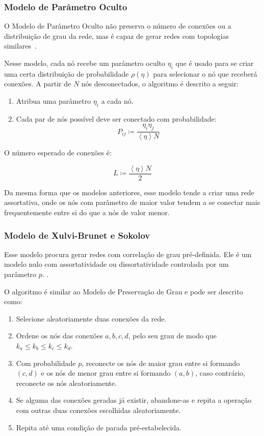 \documentclass[12pt,a4paper]{article}
\theoremstyle{hypo}
\newcommand{\avg}[1]{\left\langle #1 \right\rangle} %
\newcommand{\defn}{\coloneqq} %
\begin{document}
\subsubsection{Modelo de Parâmetro Oculto}

O Modelo de Parâmetro Oculto não preserva o número de conexões ou a distribuição de grau da rede, mas é capaz de gerar redes com topologias similares~\cite{Barabasi2016-rn}.

Nesse modelo, cada nó recebe um parâmetro oculto $\eta_i$ que é usado para se criar uma certa distribuição de probabilidade $\rho(\eta)$ para selecionar o nó que receberá conexões. A partir de $N$ nós desconectados, o algoritmo é descrito a seguir:

\begin{enumerate}
\item Atribua uma parâmetro $\eta_i$ a cada nó.
\item Cada par de nós possível deve ser conectado com probabilidade:
\begin{equation}
P_{ij} \defn \frac{\eta_i \eta_j}{\avg{\eta}N}
\end{equation}
\end{enumerate}

O número esperado de conexões é:

\begin{equation}
L \defn \frac{\avg{\eta}N}{2} 
\end{equation}

Da mesma forma que os modelos anteriores, esse modelo tende a criar uma rede assortativa, onde os nós com parâmetro de maior valor tendem a se conectar mais frequentemente entre si do que a nós de valor menor.

\subsubsection{Modelo de Xulvi-Brunet e Sokolov}

Esse modelo procura gerar redes com correlação de grau pré-definida. Ele é um modelo nulo com assortatividade ou dissortatividade controlada por um parâmetro $p$. \cite{Xulvi-Brunet2004-qg}.

O algoritmo é similar ao Modelo de Preservação de Grau e pode ser descrito como:

\begin{enumerate}
\item Selecione aleatoriamente duas conexões da rede.
\item Ordene os nós das conexões $a, b, c, d$, pelo seu grau de modo que $k_a \le k_b \le k_c \le k_d$.
\item Com probabilidade $p$, reconecte os nós de maior grau entre si formando $(c, d)$ e os nós de menor grau entre si formando $(a, b)$, caso contrário, reconecte os nós aleatoriamente.
\item Se alguma das conexões geradas já existir, abandone-as e repita a operação com outras duas conexões escolhidas aleatoriamente.
\item Repita até uma condição de parada pré-estabelecida.  
\end{enumerate}
 
\end{document}
